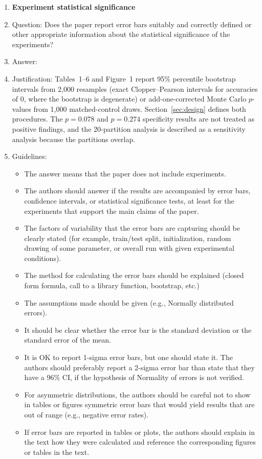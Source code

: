 \begin{enumerate}
\item {\bf Experiment statistical significance}
    \item[] Question: Does the paper report error bars suitably and correctly defined or other appropriate information about the statistical significance of the experiments?
    \item[] Answer: \answerYes{}
    \item[] Justification: Tables~1--6 and Figure~1 report 95\% percentile bootstrap intervals from 2{,}000 resamples (exact Clopper--Pearson intervals for accuracies of 0, where the bootstrap is degenerate) or add-one-corrected Monte Carlo $p$-values from 1{,}000 matched-control draws. Section~\ref{sec:design} defines both procedures. The $p=0.078$ and $p=0.274$ specificity results are not treated as positive findings, and the 20-partition analysis is described as a sensitivity analysis because the partitions overlap.
    \item[] Guidelines:
    \begin{itemize}
        \item The answer \answerNA{} means that the paper does not include experiments.
        \item The authors should answer \answerYes{} if the results are accompanied by error bars, confidence intervals, or statistical significance tests, at least for the experiments that support the main claims of the paper.
        \item The factors of variability that the error bars are capturing should be clearly stated (for example, train/test split, initialization, random drawing of some parameter, or overall run with given experimental conditions).
        \item The method for calculating the error bars should be explained (closed form formula, call to a library function, bootstrap, etc.)
        \item The assumptions made should be given (e.g., Normally distributed errors).
        \item It should be clear whether the error bar is the standard deviation or the standard error of the mean.
        \item It is OK to report 1-sigma error bars, but one should state it. The authors should preferably report a 2-sigma error bar than state that they have a 96\% CI, if the hypothesis of Normality of errors is not verified.
        \item For asymmetric distributions, the authors should be careful not to show in tables or figures symmetric error bars that would yield results that are out of range (e.g., negative error rates).
        \item If error bars are reported in tables or plots, the authors should explain in the text how they were calculated and reference the corresponding figures or tables in the text.
    \end{itemize}


\end{enumerate}
